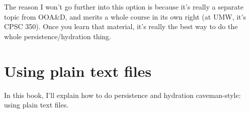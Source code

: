 The reason I won't go further into this option is because it's really a
separate topic from OOA\&D, and merits a whole course in its own right (at
UMW, it's CPSC 350). Once you learn that material, it's really the best way to
do the whole persistence/hydration thing.

\section{Using plain text files}

In this book, I'll explain how to do persistence and hydration caveman-style:
using plain text files.

